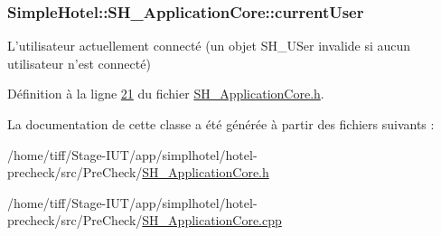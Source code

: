 \hypertarget{classSimpleHotel_1_1SH__ApplicationCore_a8404f82d10f1510c5f5259794dd3a553}{
\subsubsection[{current\-User}]{\setlength{\rightskip}{0pt plus 5cm}Simple\-Hotel\-::\-S\-H\-\_\-\-Application\-Core\-::current\-User\hspace{0.3cm}{\ttfamily [read]}}}\label{classSimpleHotel_1_1SH__ApplicationCore_a8404f82d10f1510c5f5259794dd3a553}


L'utilisateur actuellement connecté (un objet S\-H\-\_\-\-U\-Ser invalide si aucun utilisateur n'est connecté) 



Définition à la ligne \hyperlink{SH__ApplicationCore_8h_source_l00021}{21} du fichier \hyperlink{SH__ApplicationCore_8h_source}{S\-H\-\_\-\-Application\-Core.\-h}.



La documentation de cette classe a été générée à partir des fichiers suivants \-:\begin{DoxyCompactItemize}
\item 
/home/tiff/\-Stage-\/\-I\-U\-T/app/simplhotel/hotel-\/precheck/src/\-Pre\-Check/\hyperlink{SH__ApplicationCore_8h}{S\-H\-\_\-\-Application\-Core.\-h}\item 
/home/tiff/\-Stage-\/\-I\-U\-T/app/simplhotel/hotel-\/precheck/src/\-Pre\-Check/\hyperlink{SH__ApplicationCore_8cpp}{S\-H\-\_\-\-Application\-Core.\-cpp}\end{DoxyCompactItemize}
